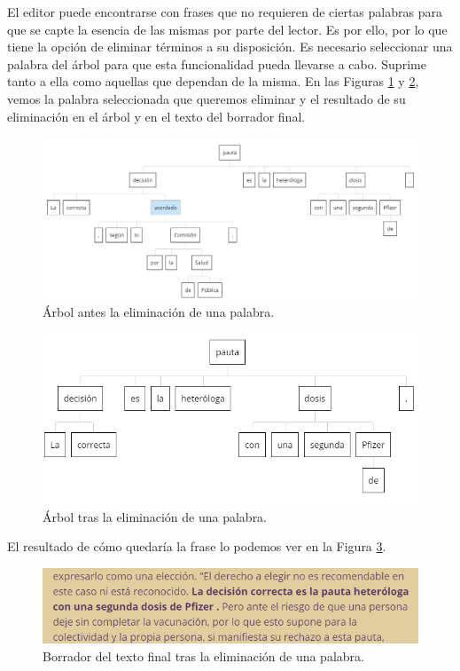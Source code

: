 El editor puede encontrarse con frases que no requieren de ciertas palabras para que se capte la esencia de las mismas por parte del lector. Es por ello, por lo que tiene la opción de eliminar términos a su disposición. Es necesario seleccionar una palabra del árbol para que esta funcionalidad pueda llevarse a cabo. Suprime tanto a ella como aquellas que dependan de la misma. En las Figuras \ref{fig:eliminacionPrevia} y \ref{fig:eliminacion}, vemos la palabra seleccionada que queremos eliminar y el resultado de su eliminación en el árbol y en el texto del borrador final.
	 \begin{figure}[h!]
	\centering
	
	
	\includegraphics[scale=0.8]{Imagenes/Figuras/EleccionEliminacion}
	
	
	\caption{Árbol antes la eliminación de una palabra.}
	\label{fig:eliminacionPrevia}
\end{figure} 
	 \begin{figure}[h!]
	\centering
	
	
	\includegraphics[scale=0.9]{Imagenes/Figuras/EliminacionSubarbol}
	
	
	\caption{Árbol tras la eliminación de una palabra.}
	\label{fig:eliminacion}
\end{figure} 
El resultado de cómo quedaría la frase lo podemos ver en la Figura \ref{fig:resultadoEliminar}.
	 \begin{figure}[h!]
	\centering
	
	
	\includegraphics[scale=1]{Imagenes/Figuras/BorradorEliminacion}
	
	
	\caption{Borrador del texto final tras la eliminación de una palabra.}
	\label{fig:resultadoEliminar}
\end{figure} 

